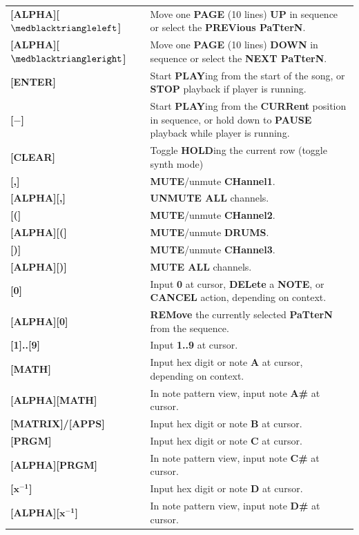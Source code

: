 \documentclass[12pt]{report}	%
\begin{document}
\begin{longtable}{p{} p{} }
\textbf{[ALPHA][\(\medblacktriangleleft\)]} & Move one \textbf{PAGE} (10 lines) \textbf{UP} in sequence or select the \textbf{PREVious PaTterN}. \\
\textbf{[ALPHA][\(\medblacktriangleright\)]} & Move one \textbf{PAGE} (10 lines) \textbf{DOWN} in sequence or select the \textbf{NEXT PaTterN}. \\
\hline
\textbf{[ENTER]} & Start \textbf{PLAY}ing from the start of the song, or \textbf{STOP} playback if player is running. \\
\textbf{[$\bm{-}$]} & Start \textbf{PLAY}ing from the \textbf{CURRent} position in sequence, or hold down to \textbf{PAUSE} playback while player is running. \\
\textbf{[CLEAR]} & Toggle \textbf{HOLD}ing the current row (toggle synth mode) \\
\hline
\textbf{[,]} & \textbf{MUTE}/unmute \textbf{CHannel1}. \\
\textbf{[ALPHA][,]} & \textbf{UNMUTE ALL} channels. \\
\textbf{[(]} & \textbf{MUTE}/unmute \textbf{CHannel2}. \\
\textbf{[ALPHA][(]} & \textbf{MUTE}/unmute \textbf{DRUMS}. \\
\textbf{[)]} & \textbf{MUTE}/unmute \textbf{CHannel3}. \\
\textbf{[ALPHA][)]} & \textbf{MUTE ALL} channels. \\
\hline
\textbf{[0]} & Input \textbf{0} at cursor, \textbf{DELete} a \textbf{NOTE}, or \textbf{CANCEL} action, depending on context. \\
\textbf{[ALPHA][0]} & \textbf{REMove} the currently selected \textbf{PaTterN} from the sequence. \\
\textbf{[1]..[9]} & Input \textbf{1..9} at cursor. \\
\textbf{[MATH]} & Input hex digit or note \textbf{A} at cursor, depending on context. \\
\textbf{[ALPHA][MATH]} & In note pattern view, input note \textbf{A\#} at cursor. \\
\textbf{[MATRIX]/[APPS]} & Input hex digit or note \textbf{B} at cursor. \\
\textbf{[PRGM]} & Input hex digit or note \textbf{C} at cursor. \\
\textbf{[ALPHA][PRGM]} & In note pattern view, input note \textbf{C\#} at cursor. \\
\textbf{[$\bm{x^{-1}}$]} & Input hex digit or note \textbf{D} at cursor. \\
\textbf{[ALPHA][$\bm{x^{-1}}$]} & In note pattern view, input note \textbf{D\#} at cursor. \\

\end{longtable}
\end{document}
